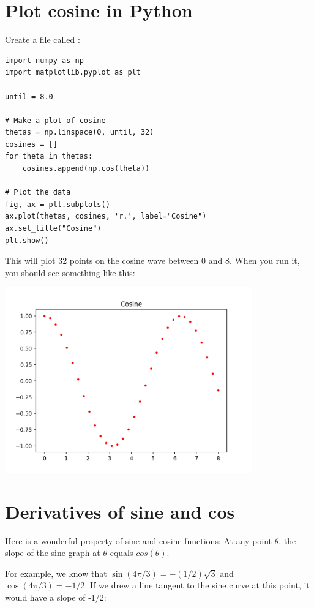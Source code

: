 \section{Plot cosine in Python}

Create a file called :

\begin{Verbatim}
import numpy as np
import matplotlib.pyplot as plt

until = 8.0

# Make a plot of cosine
thetas = np.linspace(0, until, 32)
cosines = []
for theta in thetas:
    cosines.append(np.cos(theta))

# Plot the data
fig, ax = plt.subplots()
ax.plot(thetas, cosines, 'r.', label="Cosine")
ax.set_title("Cosine")
plt.show()
\end{Verbatim}

This will plot 32 points on the cosine wave between 0 and 8. When you
run it, you should see something like this:

\includegraphics[width=0.8\textwidth]{cospy.png}

\section{Derivatives of sine and cos}

Here is a wonderful property of sine and cosine functions: At any point $\theta$, the slope of the sine graph at $\theta$ equals $cos(\theta)$.

For example, we know that $\sin(4\pi/3) = -(1/2)\sqrt{3}$ and
$\cos(4\pi/3) = -1/2$. If we drew a line tangent to the sine curve at
this point, it would have a slope of -1/2:

